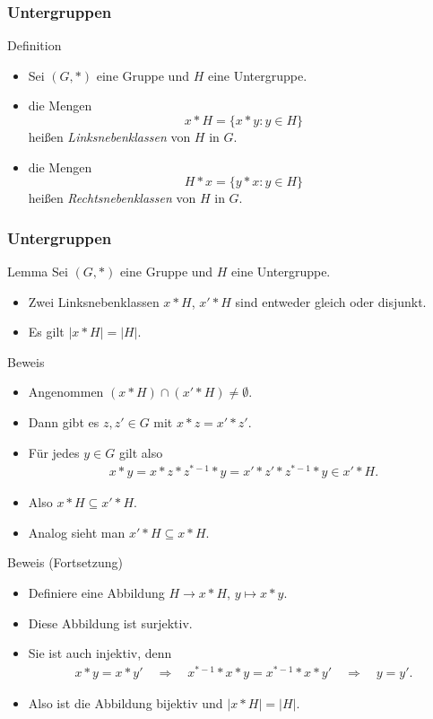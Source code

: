 \documentclass{beamer}
\renewcommand{\emph}[1]{{\textcolor{solarizedRed}{\itshape #1}}}
\newcommand{\ue}{\"u}
\begin{document}
\begin{frame}\frametitle{Untergruppen}
	\begin{block}{Definition}
		\begin{itemize}
			\item Sei $(G,*)$ eine Gruppe und $H$ eine Untergruppe.
			\item die Mengen $$x*H=\{x*y:y\in H\}$$ hei\ss en \emph{Linksnebenklassen} von $H$ in $G$.
			\item die Mengen $$H*x=\{y*x:y\in H\}$$ hei\ss en \emph{Rechtsnebenklassen} von $H$ in $G$.
		\end{itemize}
	\end{block}	
\end{frame}

\begin{frame}\frametitle{Untergruppen}
	\begin{block}{Lemma}
		Sei $(G,*)$ eine Gruppe und $H$ eine Untergruppe.
		\begin{itemize}
			\item Zwei Linksnebenklassen $x*H$, $x'*H$ sind entweder gleich oder disjunkt.
			\item Es gilt $|x*H|=|H|$.
		\end{itemize}
	\end{block}	
	\begin{overprint}
		\begin{block}{Beweis}
			\begin{itemize}
				\item Angenommen $(x*H)\cap(x'*H)\neq\emptyset$.
				\item Dann gibt es $z,z'\in G$ mit $x*z=x'*z'$.
				\item F\ue r jedes $y\in G$ gilt also
					\begin{align*}
						x*y=x*z*z^{*-1}*y=x'*z'*z^{*-1}*y\in x'*H.
					\end{align*}
				\item Also $x*H\subseteq x'*H$.
				\item Analog sieht man $x'*H\subseteq x*H$.
			\end{itemize}	
		\end{block}	
		\begin{block}{Beweis (Fortsetzung)}
			\begin{itemize}
				\item Definiere eine Abbildung $H\to x*H$, $y\mapsto x*y$.
				\item Diese Abbildung ist surjektiv.
				\item Sie ist auch injektiv, denn 
					\begin{align*}
						x*y=x*y'\quad\Rightarrow\quad x^{*-1}*x*y=x^{*-1}*x*y'\quad\Rightarrow\quad y=y'.
					\end{align*}
				\item Also ist die Abbildung bijektiv und $|x*H|=|H|$.
			\end{itemize}	
		\end{block}
	\end{overprint}
\end{frame}
\end{document}
